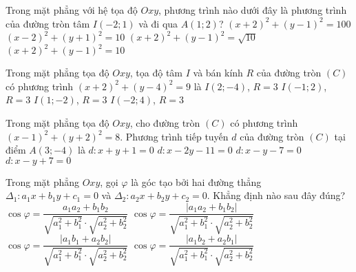\begin{ex}%
Trong mặt phẳng với hệ tọa độ $Oxy$, phương trình nào dưới đây là phương trình của đường tròn tâm $I(-2;1)$ và đi qua $A(1;2)$?
\choice
{$(x+2)^2+(y-1)^2=100$}
{$(x-2)^2+(y+1)^2=10$}
{$(x+2)^2+(y-1)^2=\sqrt{10}$}
{\True $(x+2)^2+(y-1)^2=10$}
\end{ex}
\begin{ex}%
Trong mặt phẳng tọa độ $Oxy$, tọa độ tâm $I$ và bán kính $R$ của đường tròn $(C)$ có phương trình $(x+2)^2+(y-4)^2=9$ là
\choice
{$I(2;-4)$, $R=3$}
{$I(-1;2)$, $R=3$}
{$I(1;-2)$, $R=3$}
{\True $I(-2;4)$, $R=3$}
\end{ex}
\begin{ex}%
Trong mặt phẳng tọa độ $Oxy$, cho đường tròn $(C)$ có phương trình $(x-1)^2+(y+2)^2=8$. Phương trình tiếp tuyến $d$ của đường tròn $(C)$ tại điểm $A(3;-4)$ là
\choice
{$d\colon x+y+1=0$}
{$d\colon x-2y-11=0$}
{\True $d\colon x-y-7=0$}
{$d\colon x-y+7=0$}
\end{ex}
\begin{ex}%
Trong mặt phẳng $Oxy$, gọi $\varphi$ là góc tạo bởi hai đường thẳng $\Delta_1\colon a_1 x+b_1 y+c_1=0$ và $\Delta_2\colon a_2 x+b_2 y+c_2=0$. Khẳng định nào sau đây đúng?
\choice
{$\cos \varphi=\dfrac{a_1 a_2+b_1 b_2}{\sqrt{a_1^2+b_1^2} \cdot \sqrt{a_2^2+b_2^2}}$}
{\True $\cos \varphi=\dfrac{\left|a_1 a_2+b_1 b_2\right|}{\sqrt{a_1^2+b_1^2} \cdot \sqrt{a_2^2+b_2^2}}$}
{$\cos \varphi=\dfrac{\left|a_1 b_1+a_2 b_2\right|}{\sqrt{a_1^2+b_1^2} \cdot \sqrt{a_2^2+b_2^2}}$}
{$\cos \varphi=\dfrac{\left|a_1 b_2+a_2 b_1\right|}{\sqrt{a_1^2+b_1^2} \cdot \sqrt{a_2^2+b_2^2}}$}
\end{ex}

